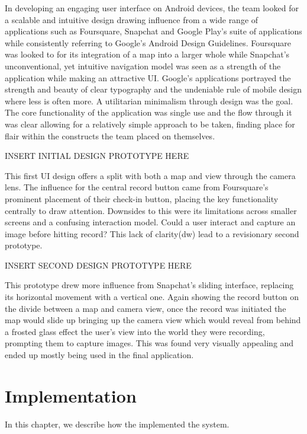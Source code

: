 \documentclass{l3proj}
\begin{document}
In developing an engaging user interface on Android devices, the team looked for
a scalable and intuitive design drawing influence from a wide range of
applications such as Foursquare, Snapchat and Google Play’s suite of
applications while consistently referring to Google’s Android Design Guidelines.
Foursquare was looked to for its integration of a map into a larger whole while
Snapchat’s unconventional, yet intuitive navigation model was seen as a strength
of the application while making an attractive UI. Google’s applications
portrayed the strength and beauty of clear typography and the undeniable rule of
mobile design where less is often more. A utilitarian minimalism through design
was the goal. The core functionality of the application was single use and the
flow through it was clear allowing for a relatively simple approach to be taken,
finding place for flair within the constructs the team placed on themselves.

INSERT INITIAL DESIGN PROTOTYPE HERE

This first UI design offers a split with both a map and view through the camera
lens. The influence for the central record button came from Foursquare’s
prominent placement of their check-in button, placing the key functionality
centrally to draw attention. Downsides to this were its limitations across
smaller screens and a confusing interaction model. Could a user interact and
capture an image before hitting record? This lack of clarity(dw) lead to a
revisionary second prototype.

INSERT SECOND DESIGN PROTOTYPE HERE

This prototype drew more influence from Snapchat’s sliding interface, replacing
its horizontal movement with a vertical one. Again showing the record button on
the divide between a map and camera view, once the record was initiated the map
would slide up bringing up the camera view which would reveal from behind a
frosted glass effect the user’s view into the world they were recording,
prompting them to capture images. This was found very visually appealing and
ended up mostly being used in the final application.


\chapter{Implementation}
\label{impl}

In this chapter, we describe how the implemented the system.
\end{document}
